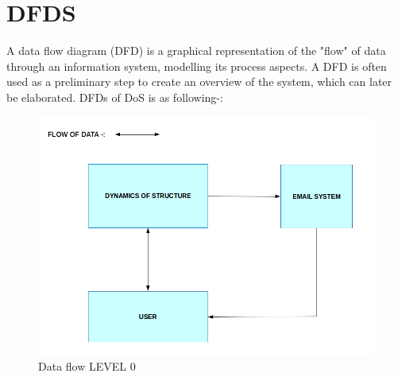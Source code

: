 \section{DFDS}
A data flow diagram (DFD) is a graphical representation of the "flow" of data through an information system, modelling its process aspects. A DFD is often used as a preliminary step to create an overview of the system, which can later be elaborated.	DFDs of DoS is as following-: 
\begin{figure}[H]
\centering \includegraphics[scale=0.4]{images/DFDS.png}
\caption{Data flow LEVEL 0}
\end{figure}

